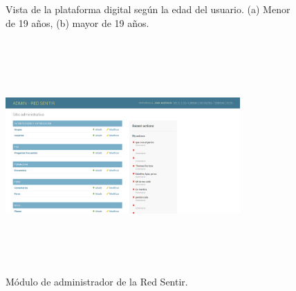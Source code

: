 \documentclass[a4paper]{article}
\begin{document}
\begin{figure}[tbp]
  \centering
	  \hspace{1mm}
  \caption{Vista de la plataforma digital según la edad del usuario. (a) Menor de 19 años, (b) mayor de 19 años.}
  \label{fig:vista_plataforma}
\end{figure}

\begin{figure}[t]
\centering
\includegraphics[width=0.8\textwidth,height=3.5in]{admin.png}
\caption{Módulo de administrador de la Red Sentir.}
\label{fig:admin}
\end{figure}
\end{document}
